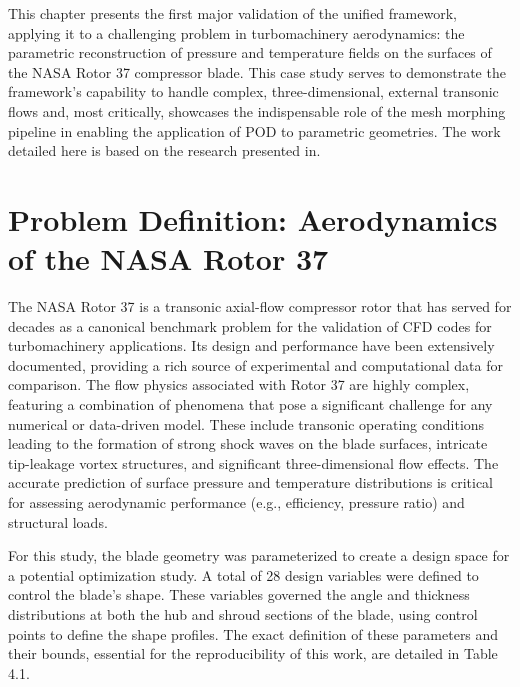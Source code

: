 \documentclass[dscexam, EN]{ufabcFHZh}
\begin{document}
This chapter presents the first major validation of the unified framework, applying it to a challenging problem in turbomachinery aerodynamics: the parametric reconstruction of pressure and temperature fields on the surfaces of the NASA Rotor 37 compressor blade. This case study serves to demonstrate the framework's capability to handle complex, three-dimensional, external transonic flows and, most critically, showcases the indispensable role of the mesh morphing pipeline in enabling the application of POD to parametric geometries. The work detailed here is based on the research presented in. 

\section{Problem Definition: Aerodynamics of the NASA Rotor 37}

The NASA Rotor 37 is a transonic axial-flow compressor rotor that has served for decades as a canonical benchmark problem for the validation of CFD codes for turbomachinery applications. Its design and performance have been extensively documented, providing a rich source of experimental and computational data for comparison. The flow physics associated with Rotor 37 are highly complex, featuring a combination of phenomena that pose a significant challenge for any numerical or data-driven model. These include transonic operating conditions leading to the formation of strong shock waves on the blade surfaces, intricate tip-leakage vortex structures, and significant three-dimensional flow effects. The accurate prediction of surface pressure and temperature distributions is critical for assessing aerodynamic performance (e.g., efficiency, pressure ratio) and structural loads. 

For this study, the blade geometry was parameterized to create a design space for a potential optimization study. A total of 28 design variables were defined to control the blade's shape. These variables governed the angle and thickness distributions at both the hub and shroud sections of the blade, using control points to define the shape profiles. The exact definition of these parameters and their bounds, essential for the reproducibility of this work, are detailed in Table 4.1.
\end{document}
